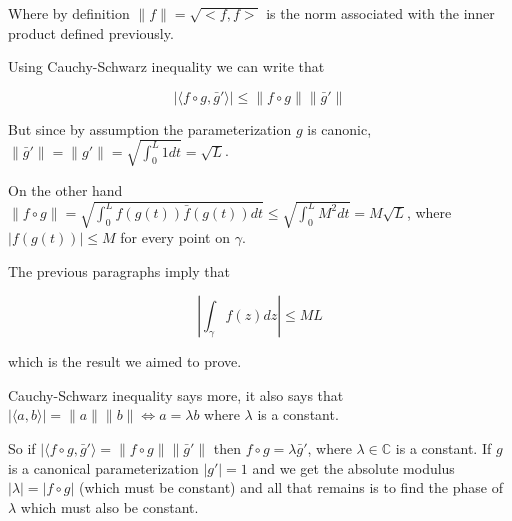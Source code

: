 \documentclass[12pt]{article}
\begin{document}
Where by definition $\| f \| = \sqrt{<f,f>}$ is the norm associated with the inner product defined previously.

Using Cauchy-Schwarz inequality we can write that

\begin{equation}
|\langle f\circ g, \bar{g}' \rangle| \le \|f\circ g\| \|\bar{g}'\|
\end{equation}

But since by assumption the parameterization $g$ is canonic, $\|\bar{g}'\|=\|g'\|=\sqrt{\int_0^L 1 dt} = \sqrt{L}$.

On the other hand $\|f\circ g\|=\sqrt{\int_0^L f(g(t)) \bar{f}(g(t))dt} \le \sqrt{\int_0^L M^2 dt} = M\sqrt{L}$, where $|f(g(t))|\le M$ for every point on $\gamma$.

The previous paragraphs imply that

\begin{equation}
\left|\int_\gamma f(z) dz\right|\le ML
\end{equation}

which is the result we aimed to prove.

Cauchy-Schwarz inequality says more, it also says that $|\langle a,b \rangle |=\|a\|\|b\| \iff a=\lambda b$ where $\lambda$ is a constant.

So if $|\langle f\circ g, \bar{g}' \rangle =\|f\circ g\|\|\bar{g}'\|$ then $f\circ g = \lambda \bar{g}'$, where $\lambda \in \mathbb{C}$ is a constant.
If $g$ is a canonical parameterization $|g'| = 1$ and we get the absolute modulus  $|\lambda| = |f\circ g|$ (which must be constant) and all that remains is to find the phase of $\lambda$ which must also be constant.

\end{document}
